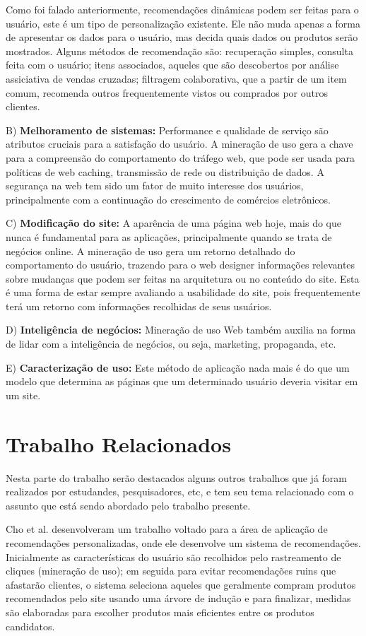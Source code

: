     Como foi falado anteriormente, recomendações dinâmicas podem ser feitas para o usuário, este é um tipo de personalização existente. Ele não muda apenas a forma de apresentar os dados para o usuário, mas decida quais dados ou produtos serão mostrados. Alguns métodos de recomendação são: recuperação simples, consulta feita com o usuário; itens associados, aqueles que são descobertos por análise assiciativa de vendas cruzadas; filtragem colaborativa, que a partir de um item comum, recomenda outros frequentemente vistos ou comprados por outros clientes.

B) \textbf{Melhoramento de sistemas:}
    Performance e qualidade de serviço são atributos cruciais para a satisfação do usuário. A mineração de uso gera a chave para a compreensão do comportamento do tráfego web, que pode ser usada para políticas de web caching, transmissão de rede ou distribuição de dados. A segurança na web tem sido um fator de muito interesse dos usuários, principalmente com a continuação do crescimento de comércios eletrônicos.

C) \textbf{Modificação do site:}
    A aparência de uma página web hoje, mais do que nunca é fundamental para as aplicações, principalmente quando se trata de negócios online. A mineração de uso gera um retorno detalhado do comportamento do usuário, trazendo para o web designer informações relevantes sobre mudanças que podem ser feitas na arquitetura ou no conteúdo do site. Esta é uma forma de estar sempre avaliando a usabilidade do site, pois frequentemente terá um retorno com informações recolhidas de seus usuários.

D) \textbf{Inteligência de negócios:}
    Mineração de uso Web também auxilia na forma de lidar com a inteligência de negócios, ou seja, marketing, propaganda, etc.

E) \textbf{Caracterização de uso:}
    Este método de aplicação nada mais é do que um modelo que determina as páginas que um determinado usuário deveria visitar em um site.

\section{Trabalho Relacionados}
    Nesta parte do trabalho serão destacados alguns outros trabalhos que já foram realizados por estudandes, pesquisadores, etc, e tem seu tema relacionado com o assunto que está sendo abordado pelo trabalho presente.

    Cho et al.\cite{HoCho} desenvolveram um trabalho voltado para a área de aplicação de recomendações personalizadas, onde ele desenvolve um sistema de recomendações. Inicialmente as características do usuário são recolhidos pelo rastreamento de cliques (mineração de uso); em seguida para evitar recomendações ruins que afastarão clientes, o sistema seleciona aqueles que geralmente compram produtos recomendados pelo site usando uma árvore de indução e para finalizar, medidas são elaboradas para escolher produtos mais eficientes entre os produtos candidatos.

